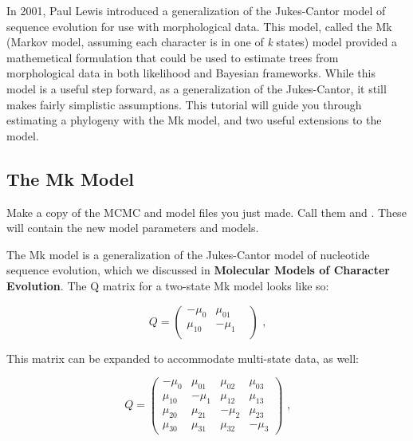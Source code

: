 In 2001, Paul Lewis \citep{lewis01} introduced a generalization of the Jukes-Cantor model of sequence evolution for use with morphological data.
This model, called the Mk (Markov model, assuming each character is in one of \textit{k} states) model provided a mathemetical formulation that could be used to estimate trees from morphological data in both likelihood and Bayesian frameworks. 
While this model is a useful step forward, as a generalization of the Jukes-Cantor, it still makes fairly simplistic assumptions.
This tutorial will guide you through estimating a phylogeny with the Mk model, and two useful extensions to the model. \par

\subsection{The Mk Model}
{\begin{framed}
Make a copy of the MCMC and model files you just made. 
Call them  and . 
These will contain the new model parameters and models. \par 
\end{framed}}

The Mk model is a generalization of the Jukes-Cantor model of nucleotide sequence evolution, which we discussed in \textbf{Molecular Models of Character Evolution}. 
The Q matrix for a two-state Mk model looks like so:

\begin{equation*}
Q = \begin{pmatrix} -\mu_0 & \mu_{01} \\
\mu_{10} & -\mu_1  &\\
\end{pmatrix} \mbox{  ,}
\end{equation*}

This matrix can be expanded to accommodate multi-state data, as well:

\begin{equation*}
Q = \begin{pmatrix} -\mu_0 & \mu_{01} & \mu_{02} & \mu_{03} \\
\mu_{10} & -\mu_1  & \mu_{12} & \mu_{13} \\
\mu_{20} & \mu_{21} & -\mu_2  & \mu_{23} \\
\mu_{30} & \mu_{31} & \mu_{32} & -\mu_3 
\end{pmatrix} \mbox{  ,}
\end{equation*}

